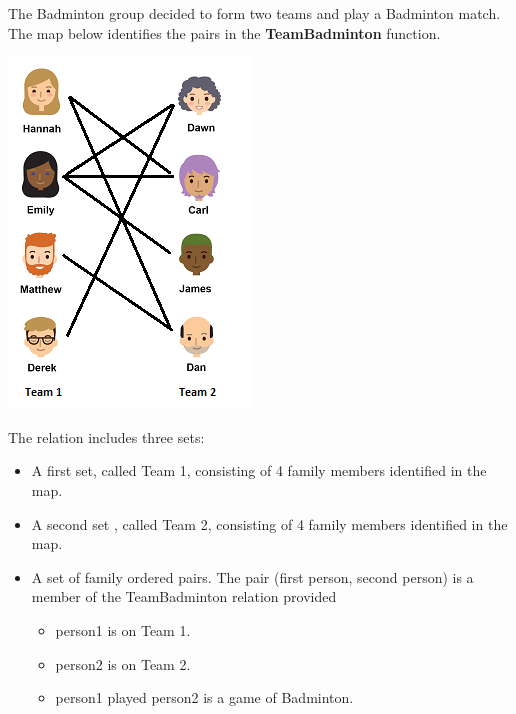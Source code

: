 \documentclass{ximera}
\begin{document}
\begin{definition}
The Badminton group decided to form two teams and play a Badminton match. The map below identifies the pairs in the \textbf{TeamBadminton} function.
  
  

    \includegraphics[width=245px,height=352px]{pics/badminton2.png}

  
 

  The  relation includes three sets:
    \begin{itemize}
    \item A first set, called Team 1, consisting of 4 family members identified in the map.
    \item A second set , called Team 2, consisting of 4 family members identified in the map.
    \item A set of family ordered pairs. The pair (first person, second person) is a member of the TeamBadminton relation  provided
            \begin{itemize}
            \item person1 is on Team 1.
            \item person2 is on Team 2.
            \item person1 played person2 is a game of Badminton.
            \end{itemize}

    \end{itemize}

  
\end{definition}
\end{document}
